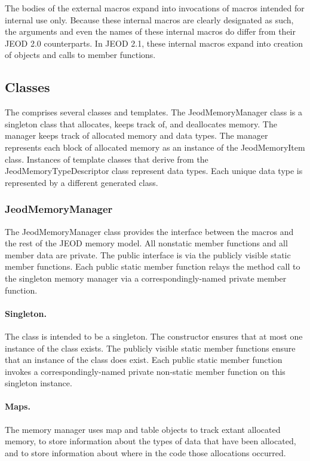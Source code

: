 The bodies of the external macros expand into invocations of \ModelDesc macros
intended for internal use only. Because these internal macros are clearly
designated as such, the arguments and even the names of these internal macros
do differ from their JEOD 2.0 counterparts.
In JEOD 2.1, these internal macros expand into creation of \ModelDesc objects
and calls to \ModelDesc member functions.

\subsection{Classes}
The \ModelDesc comprises several classes and templates.
The JeodMemoryManager class is a singleton class that
allocates, keeps track of, and deallocates memory.
The manager keeps track of allocated memory and data types.
The manager represents each block of allocated memory as an instance of
the JeodMemoryItem class.
Instances of template classes that derive from the
JeodMemoryTypeDescriptor class represent data types. Each unique
data type is represented by a different generated class.

\subsubsection{JeodMemoryManager}
The JeodMemoryManager class provides the interface between the \ModelDesc
macros and the rest of the JEOD memory model.
All nonstatic member functions and all member data are private.
The public interface is via the publicly visible static member functions.
Each public static member function relays the method call to the singleton
memory manager via a correspondingly-named private member function.

\paragraph{Singleton.}
The class is intended to be a singleton. The constructor ensures that at most
one instance of the class exists. The publicly visible static member functions
ensure that an instance of the class does exist.
Each public static member function invokes a correspondingly-named private
non-static member function on this singleton instance.

\paragraph{Maps.}
The memory manager uses map and table objects
to track extant allocated memory,
to store information about the types of data that have been allocated,
and to store information about where in the code those allocations occurred.

